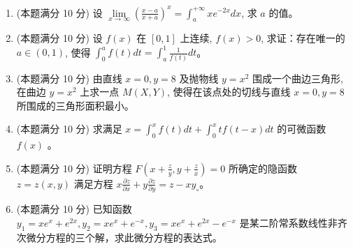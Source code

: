 \begin{enumerate}
\item 
(本题满分 10 分)
设 $\lim\limits _{x \rightarrow \infty}\left(\frac{x-a}{x+a}\right)^{x}=\int_{a}^{+\infty} x e^{-2 x} d x$, 求 $a$ 的值。





\item 
(本题满分 10 分)
设 $f(x)$ 在 $[0,1]$ 上连续, $f(x)>0$, 求证：存在唯一的 $a \in(0,1)$, 使得 $\int_{0}^{a} f(t) d t=\int_{a}^{1} \frac{1}{f(t)} d t$。




\item 
(本题满分 10 分)
由直线 $x=0, y=8$ 及抛物线 $y=x^{2}$ 围成一个曲边三角形, 在曲边 $y=x^{2}$ 上求一点 $M(X, Y)$, 使得在该点处的切线与直线 $x=0, y=8$ 所围成的三角形面积最小。




\item 
(本题满分 10 分)
求满足 $x=\int_{0}^{x} f(t) d t + \int_{0}^{x} t f(t-x) d t$ 的可微函数 $f(x)$ 。



\item 
(本题满分 10 分)
证明方程 $F\left(x+\frac{z}{y}, y+\frac{z}{x}\right)=0$ 所确定的隐函数 $z=z(x, y)$ 满足方程 $x \frac{\partial z}{\partial x}+y \frac{\partial z}{\partial y}=z-x y_{\circ}$。




\newpage
\item 
(本题满分 10 分)
已知函数 $y_{1}=x e^{x}+e^{2 x}, y_{2}=x e^{x}+e^{-x}, y_{3}=x e^{x}+e^{2 x}-e^{-x}$ 是某二阶常系数线性非齐次微分方程的三个解，求此微分方程的表达式。




\end{enumerate}

